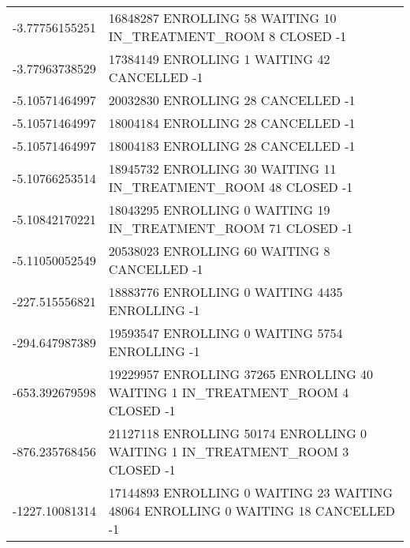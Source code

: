 {\begin{longtable}{|c|p{}|}
-3.77756155251 & 16848287 ENROLLING 58 WAITING 10 IN\_TREATMENT\_ROOM 8 CLOSED -1 \\
-3.77963738529 & 17384149 ENROLLING 1 WAITING 42 CANCELLED -1 \\
\hline
-5.10571464997 & 20032830 ENROLLING 28 CANCELLED -1 \\
-5.10571464997 & 18004184 ENROLLING 28 CANCELLED -1 \\
-5.10571464997 & 18004183 ENROLLING 28 CANCELLED -1 \\
-5.10766253514 & 18945732 ENROLLING 30 WAITING 11 IN\_TREATMENT\_ROOM 48 CLOSED -1 \\
-5.10842170221 & 18043295 ENROLLING 0 WAITING 19 IN\_TREATMENT\_ROOM 71 CLOSED -1 \\
-5.11050052549 & 20538023 ENROLLING 60 WAITING 8 CANCELLED -1 \\
\hline
-227.515556821 & 18883776 ENROLLING 0 WAITING 4435 ENROLLING -1 \\
-294.647987389 & 19593547 ENROLLING 0 WAITING 5754 ENROLLING -1 \\
-653.392679598 & 19229957 ENROLLING 37265 ENROLLING 40 WAITING 1 IN\_TREATMENT\_ROOM 4 CLOSED -1 \\
-876.235768456 & 21127118 ENROLLING 50174 ENROLLING 0 WAITING 1 IN\_TREATMENT\_ROOM 3 CLOSED -1 \\
-1227.10081314 & 17144893 ENROLLING 0 WAITING 23 WAITING 48064 ENROLLING 0 WAITING 18 CANCELLED -1 \\
\hline

\end{longtable}
}
